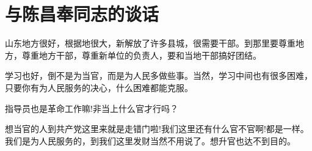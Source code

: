 \section[与陈昌奉同志的谈话（一九五八年八月九日）]{与陈昌奉同志的谈话}


山东地方很好，根据地很大，新解放了许多县城，很需要干部。到那里要尊重地方，尊重地方干部，尊重新单位的负责人，要和当地干部搞好团结。

学习也好，倒不是为当官，而是为人民多做些事。当然，学习中间也有很多困难，只要你有为人民服务的决心，什么困难都能克服。

指导员也是革命工作嘛!非当上什么官才行吗？

想当官的人到共产党这里来就是走错门啦!我们这里还有什么官不官啊!都是一样。我们是为人民服务的，到我们这里发财当然不用说了。想升官也达不到目的。


